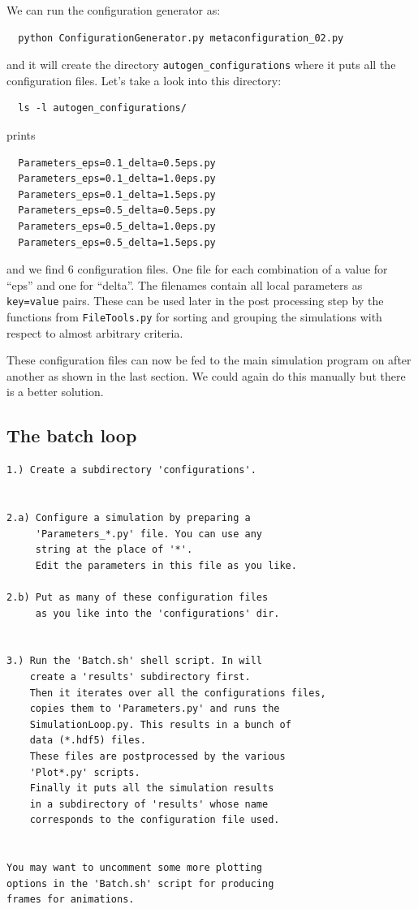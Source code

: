 \documentclass[a4paper,10pt]{report}
\begin{document}
We can run the configuration generator as:

\begin{verbatim}
  python ConfigurationGenerator.py metaconfiguration_02.py
\end{verbatim}

and it will create the directory \texttt{autogen\_configurations} where it puts
all the configuration files. Let's take a look into this directory:

\begin{verbatim}
  ls -l autogen_configurations/
\end{verbatim}

prints

\begin{verbatim}
  Parameters_eps=0.1_delta=0.5eps.py
  Parameters_eps=0.1_delta=1.0eps.py
  Parameters_eps=0.1_delta=1.5eps.py
  Parameters_eps=0.5_delta=0.5eps.py
  Parameters_eps=0.5_delta=1.0eps.py
  Parameters_eps=0.5_delta=1.5eps.py
\end{verbatim}

and we find 6 configuration files. One file for each combination of a value for
``eps'' and one for ``delta''. The filenames contain all local parameters as \texttt{key=value}
pairs. These can be used later in the post processing step by the functions from
\texttt{FileTools.py} for sorting and grouping the simulations with respect to
almost arbitrary criteria.

These configuration files can now be fed to the main simulation program on after
another as shown in the last section. We could again do this manually but there is
a better solution.

\subsection{The batch loop}

\begin{verbatim}
1.) Create a subdirectory 'configurations'.


2.a) Configure a simulation by preparing a
     'Parameters_*.py' file. You can use any
     string at the place of '*'.
     Edit the parameters in this file as you like.

2.b) Put as many of these configuration files
     as you like into the 'configurations' dir.


3.) Run the 'Batch.sh' shell script. In will
    create a 'results' subdirectory first.
    Then it iterates over all the configurations files,
    copies them to 'Parameters.py' and runs the
    SimulationLoop.py. This results in a bunch of
    data (*.hdf5) files.
    These files are postprocessed by the various
    'Plot*.py' scripts.
    Finally it puts all the simulation results
    in a subdirectory of 'results' whose name
    corresponds to the configuration file used.


You may want to uncomment some more plotting
options in the 'Batch.sh' script for producing
frames for animations.
\end{verbatim}
\end{document}
